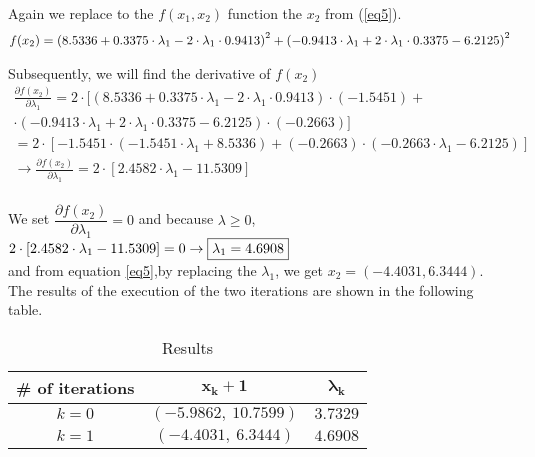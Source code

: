 Again we replace to the $f(x_1,x_2)$ function the $x_2$ from (\ref{eq5}).
\begin{equation}
	\centering
	\begin{gathered}
		f(x_2) = \left(8.5336+0.3375 \cdot \lambda_1-2 \cdot \lambda_1 \cdot 0.9413 \right)^2+\left(-0.9413 \cdot \lambda_1+2 \cdot \lambda_1 \cdot 0.3375-6.2125\right)^2
	\end{gathered}
\end{equation}
\label{eq6}

Subsequently, we will find the derivative of $f(x_2)$\\
\[
\begin{gathered}
	\frac{\partial f(x_2)}{\partial \lambda_1} = 2\cdot[(8.5336+0.3375 \cdot \lambda_1-2 \cdot \lambda_1 \cdot 0.9413) \cdot (-1.5451)
	+ \\ \cdot(-0.9413 \cdot \lambda_1+2 \cdot \lambda_1 \cdot 0.3375-6.2125) \cdot (-0.2663)]\\
	= 2 \cdot [-1.5451 \cdot (-1.5451 \cdot \lambda_1+8.5336)+(-0.2663)\cdot(-0.2663\cdot\lambda_1-6.2125)] \\[2mm]
	\rightarrow \frac{\partial f(x_2)}{\partial \lambda_1} = 2\cdot[2.4582 \cdot \lambda_1-11.5309]
\end{gathered}
\]\\

We set $\dfrac{\partial f(x_2)}{\partial \lambda_1} = 0$ and because $\lambda \geq 0$,\\

$2\cdot[2.4582 \cdot \lambda_1-11.5309] = 0 \rightarrow \fbox{{\(\lambda_1 = 4.6908\)}}$ \\

and from equation \ref{eq5},by replacing the $\lambda_1$, we get $x_2 = (-4.4031,6.3444)$.
\\[4mm]
The results of the execution of the two iterations are shown in the following table.

\begin{table}[H]
	\centering
	\begin{tabular}{|c|c|c|}
		\hline
		\textbf{\# of iterations} & $\mathbf{x_k+1}$ & $\mathbf{\lambda_k}$ \\ \hline
		$k = 0$ & $(-5.9862,\ 10.7599)$ & $3.7329$ \\ \hline
		$k = 1$ & $(-4.4031,\ 6.3444)$ & $4.6908$\\
		\hline
	\end{tabular}
	\caption{Results}
\end{table}











